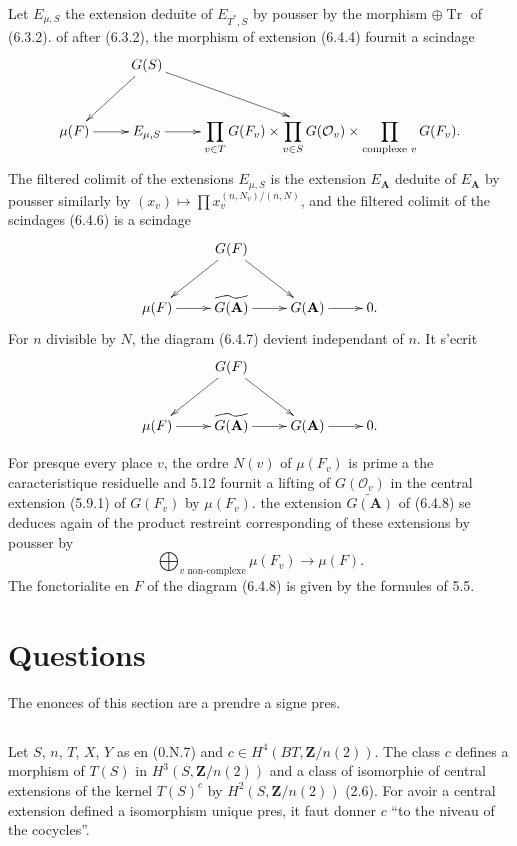 \documentclass[11pt,a4paper]{article}
\theoremstyle{plain}
\theoremstyle{definition}
\DeclareMathOperator{\Tr}{Tr}
\begin{document}
Let $E_{\mu,S}$ the extension deduite of $E_{T^*,S}$ by pousser by the morphism $\oplus \Tr$ of (6.3.2). of after (6.3.2), the morphism of extension (6.4.4) fournit a scindage
\[
\xymatrix{
& G(S) \ar[dl] \ar[dr] & \\
\mu(F) \ar[r] & E_{\mu,S} \ar[r] & \displaystyle\prod_{v \in T} G(F_v) \times \prod_{v \in S} G(\mathcal{O}_v) \times \prod_{\text{complexe } v} G(F_v). }
\]
The filtered colimit of the extensions $E_{\mu,S}$ is the extension $E_{\mathbf{A}}$ deduite of $E_{\mathbf{A}}$ by pousser similarly by $(x_v) \mapsto \prod x_v^{(n,N_v)/(n,N)}$, and the filtered colimit of the scindages (6.4.6) is a scindage
\[
\xymatrix{
& G(F) \ar[dl] \ar[dr] & \\
\mu(F) \ar[r] & \widetilde{G(\mathbf{A})} \ar[r] & G(\mathbf{A}) \ar[r] & 0. }
\]
For $n$ divisible by $N$, the diagram (6.4.7) devient independant of $n$. It s'ecrit
\begin{equation}\label{6.4.8}
\xymatrix{
& G(F) \ar[dl] \ar[dr] & \\
\mu(F) \ar[r] & \widetilde{G(\mathbf{A})} \ar[r] & G(\mathbf{A}) \ar[r] & 0. }
\end{equation}

For presque every place $v$, the ordre $N(v)$ of $\mu(F_v)$ is prime a the caracteristique residuelle and 5.12 fournit a lifting of $G(\mathcal{O}_v)$ in the central extension (5.9.1) of $G(F_v)$ by $\mu(F_v)$. the extension $\widetilde{G(\mathbf{A})}$ of (6.4.8) se deduces again of the product restreint corresponding of these extensions by pousser by
\[
\bigoplus_{v \text{ non-complexe}} \mu(F_v) \to \mu(F).
\]
The fonctorialite en $F$ of the diagram (6.4.8) is given by the formules of 5.5.

\section{Questions}

The enonces of this section are a prendre a signe pres.

\subsection{}\label{7.1}

Let $S$, $n$, $T$, $X$, $Y$ as en (0.N.7) and $c \in H^4(BT, \mathbf{Z}/n(2))$. The class $c$ defines a morphism of $T(S)$ in $H^3(S, \mathbf{Z}/n(2))$ and a class of isomorphie of central extensions of the kernel $T(S)^c$ by $H^2(S, \mathbf{Z}/n(2))$ (2.6). For avoir a central extension defined a isomorphism unique pres, it faut donner $c$ ``to the niveau of the cocycles''.
\end{document}
